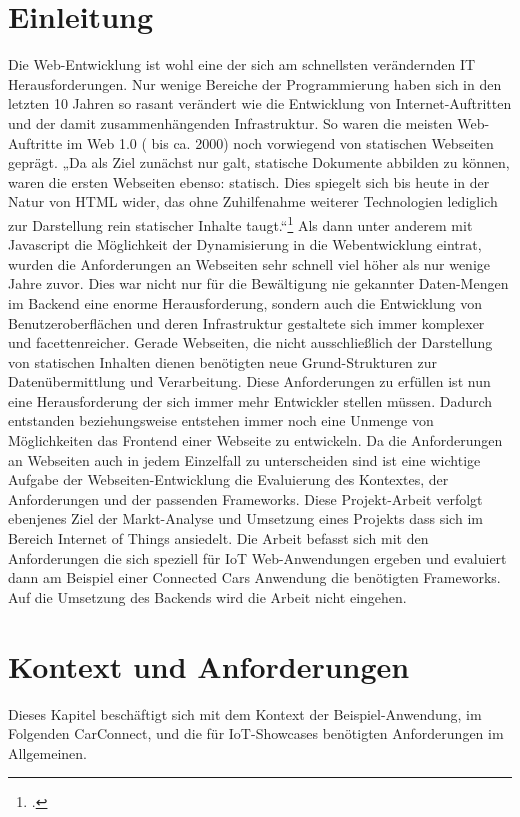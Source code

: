 \documentclass[12pt,a4paper,oneside, 
liststotoc, 					%
bibtotoc,						%
titlepage, 						%
headsepline, 					%
BCOR6mm,						%
openany,							%
]{scrreprt}
\begin{document}
\chapter{Einleitung}
Die Web-Entwicklung ist wohl eine der sich am schnellsten verändernden IT Herausforderungen. Nur wenige Bereiche der Programmierung haben sich in den letzten 10 Jahren so rasant verändert wie die Entwicklung von Internet-Auftritten und der damit zusammenhängenden Infrastruktur. So waren die meisten Web-Auftritte im Web 1.0 ( bis ca. 2000) noch vorwiegend von statischen Webseiten geprägt. 
„Da als Ziel zunächst nur galt, statische Dokumente abbilden zu können, waren die ersten Webseiten ebenso: statisch. Dies spiegelt sich bis heute in der Natur von HTML wider, das ohne Zuhilfenahme weiterer Technologien lediglich zur Darstellung rein statischer Inhalte taugt.“\footcite{nodejsroden}
Als dann unter anderem mit Javascript die Möglichkeit der Dynamisierung in die Webentwicklung eintrat, wurden die Anforderungen an Webseiten sehr schnell viel höher als nur wenige Jahre zuvor. Dies war nicht nur für die Bewältigung nie gekannter Daten-Mengen im Backend eine enorme Herausforderung, sondern auch die Entwicklung von Benutzeroberflächen und deren Infrastruktur gestaltete sich immer komplexer und facettenreicher. Gerade Webseiten, die nicht ausschließlich der Darstellung von statischen Inhalten dienen benötigten neue Grund-Strukturen zur Datenübermittlung und Verarbeitung. Diese Anforderungen zu erfüllen ist nun eine Herausforderung der sich immer mehr Entwickler stellen müssen. Dadurch entstanden beziehungsweise entstehen immer noch eine Unmenge von Möglichkeiten das Frontend einer Webseite zu entwickeln. Da die Anforderungen an Webseiten auch in jedem Einzelfall zu unterscheiden sind ist eine wichtige Aufgabe der Webseiten-Entwicklung die Evaluierung des Kontextes, der Anforderungen und der passenden Frameworks. Diese Projekt-Arbeit verfolgt ebenjenes Ziel der Markt-Analyse und Umsetzung eines Projekts dass sich im Bereich Internet of Things ansiedelt. Die Arbeit befasst sich mit den Anforderungen die sich speziell für IoT Web-Anwendungen ergeben und evaluiert dann am Beispiel einer Connected Cars Anwendung die benötigten Frameworks. Auf die Umsetzung des Backends wird die Arbeit nicht eingehen. 


\chapter{ Kontext und Anforderungen}\label{context}
Dieses Kapitel beschäftigt sich mit dem Kontext der Beispiel-Anwendung, im Folgenden CarConnect, und die für IoT-Showcases benötigten Anforderungen im Allgemeinen.
\end{document}
